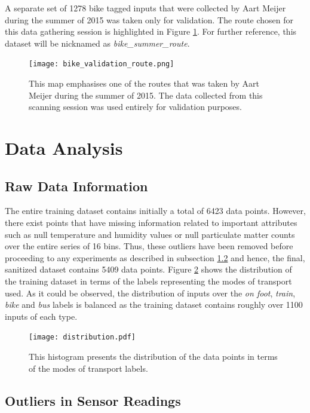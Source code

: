 \documentclass[bsc,frontabs,twoside,singlespacing, parskip,deptreport]{infthesis}     %
\begin{document}
A separate set of 1278 bike tagged inputs that were collected by Aart Meijer during the summer of 2015 was taken only for validation. The route chosen for this data gathering session is highlighted in Figure \ref{fig:bike-validation-route}. For further reference, this dataset will be nicknamed as \textit{bike\_summer\_route}.

\begin{figure}[h!]
  \center
  \texttt{[image: bike\_validation\_route.png]} 
  \caption{This map emphasises one of the routes that was taken by Aart Meijer during the summer of 2015. The data collected from this scanning session was used entirely for validation purposes.}
  \label{fig:bike-validation-route}
\end{figure}

\section{Data Analysis}
\label{sec:data-analysis}

\subsection{Raw Data Information}

The entire training dataset contains initially a total of 6423 data points. However, there exist points that have missing information related to important attributes such as null temperature and humidity values or null particulate matter counts over the entire series of 16 bins. Thus, these outliers have been removed before proceeding to any experiments as described in subsection \ref{subsec:outlier-removal} and hence, the final, sanitized dataset contains 5409 data points. Figure \ref{fig:distribution} shows the distribution of the training dataset in terms of the labels representing the modes of transport used. As it could be observed, the distribution of inputs over the \textit{on foot}, \textit{train}, \textit{bike} and \textit{bus} labels is balanced as the training dataset contains roughly over 1100 inputs of each type.

\begin{figure}[h!]
  \center
  \texttt{[image: distribution.pdf]}
  \caption{This histogram presents the distribution of the data points in terms of the modes of transport labels.}
  \label{fig:distribution}
\end{figure}


\subsection{Outliers in Sensor Readings}
\label{subsec:outlier-removal}
\end{document}
